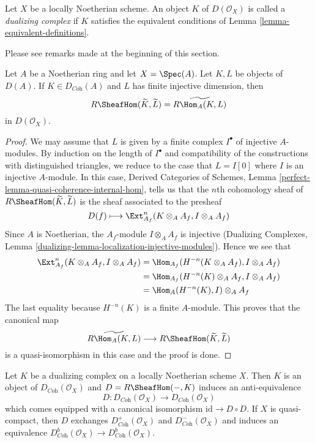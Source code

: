 \begin{definition}
\label{definition-dualizing-scheme}
Let $X$ be a locally Noetherian scheme. An object $K$ of
$D(\mathcal{O}_X)$ is called a {\it dualizing complex} if
$K$ satisfies the equivalent conditions of
Lemma \ref{lemma-equivalent-definitions}.
\end{definition}

\noindent
Please see remarks made at the beginning of this section.

\begin{lemma}
\label{lemma-affine-duality}
Let $A$ be a Noetherian ring and let $X = \Spec(A)$. Let $K, L$ be objects
of $D(A)$. If $K \in D_{\textit{Coh}}(A)$ and $L$ has finite injective
dimension, then
$$
R\SheafHom(\widetilde{K}, \widetilde{L})
=
\widetilde{R\Hom_A(K, L)}
$$
in $D(\mathcal{O}_X)$.
\end{lemma}

\begin{proof}
We may assume that $L$ is given by a finite complex $I^\bullet$
of injective $A$-modules. By induction on the length of $I^\bullet$
and compatibility of the constructions with distinguished triangles,
we reduce to the case that $L = I[0]$ where $I$ is an injective $A$-module.
In this case, Derived Categories of Schemes, Lemma
\ref{perfect-lemma-quasi-coherence-internal-hom}, tells us that
the $n$th cohomology sheaf of $R\SheafHom(\widetilde{K}, \widetilde{L})$
is the sheaf associated to the presheaf
$$
D(f) \longmapsto \Ext^n_{A_f}(K \otimes_A A_f, I \otimes_A A_f)
$$
Since $A$ is Noetherian, the $A_f$-module $I \otimes_A A_f$ is injective
(Dualizing Complexes, Lemma
\ref{dualizing-lemma-localization-injective-modules}). Hence we see that
\begin{align*}
\Ext^n_{A_f}(K \otimes_A A_f, I \otimes_A A_f)
& =
\Hom_{A_f}(H^{-n}(K \otimes_A A_f), I \otimes_A A_f) \\
& =
\Hom_{A_f}(H^{-n}(K) \otimes_A A_f, I \otimes_A A_f) \\
& =
\Hom_A(H^{-n}(K), I) \otimes_A A_f
\end{align*}
The last equality because $H^{-n}(K)$ is a finite $A$-module.
This proves that the canonical map
$$
\widetilde{R\Hom_A(K, L)}
\longrightarrow
R\SheafHom(\widetilde{K}, \widetilde{L})
$$
is a quasi-isomorphism in this case and the proof is done.
\end{proof}

\begin{lemma}
\label{lemma-dualizing-schemes}
Let $K$ be a dualizing complex on a locally Noetherian scheme $X$.
Then $K$ is an object of $D_{\textit{Coh}}(\mathcal{O}_X)$
and $D = R\SheafHom(-, K)$ induces an anti-equivalence
$$
D :
D_{\textit{Coh}}(\mathcal{O}_X)
\longrightarrow
D_{\textit{Coh}}(\mathcal{O}_X)
$$
which comes equipped with a canonical isomorphism
$\text{id} \to D \circ D$. If $X$ is quasi-compact, then
$D$ exchanges $D^+_{\textit{Coh}}(\mathcal{O}_X)$ and
$D^-_{\textit{Coh}}(\mathcal{O}_X)$ and induces an equivalence
$D^b_{\textit{Coh}}(\mathcal{O}_X) \to D^b_{\textit{Coh}}(\mathcal{O}_X)$.
\end{lemma}

